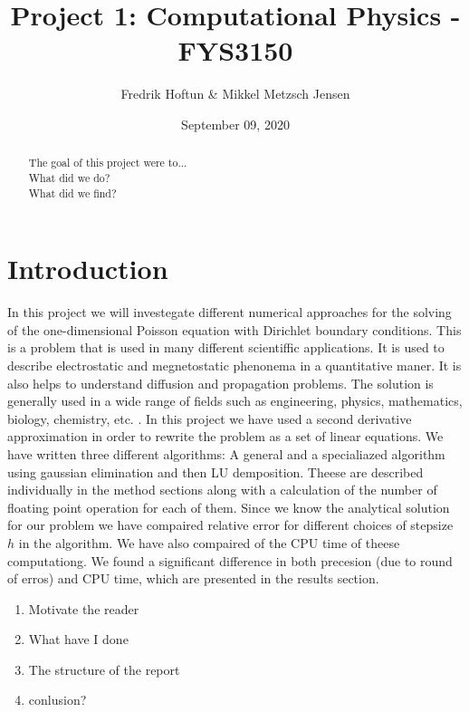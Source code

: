 \documentclass[american,a4paper,12pt]{article}
\title{Project 1: Computational Physics - FYS3150}
\author{Fredrik Hoftun \& Mikkel Metzsch Jensen}
\date{September 09, 2020}
\begin{document}
\maketitle

\tableofcontents


\begin{abstract}
  The goal of this project were to... \\
  What did we do? \\
  What did we find? \\
\end{abstract}

\section{Introduction}
  In this project we will investegate different numerical approaches for the solving of the one-dimensional Poisson equation with Dirichlet boundary conditions. This is a problem that is used in many different scientiffic applications. It is used to describe electrostatic and megnetostatic phenonema in a quantitative maner. It is also helps to understand diffusion and propagation problems. The solution is generally used in a wide range of fields such as engineering, physics, mathematics, biology, chemistry, etc. \cite{poisson_paper}. In this project we have used a second derivative approximation in order to rewrite the problem as a set of linear equations. We have written three different algorithms: A general and a specialiazed algorithm using gaussian elimination and then LU demposition. Theese are described individually in the method sections along with a calculation of the number of floating point operation for each of them. Since we know the analytical solution for our problem we have compaired relative error for different choices of stepsize $h$ in the algorithm. We have also compaired of the CPU time of theese computationg. We found a significant difference in both precesion (due to round of erros) and CPU time, which are presented in the results section.

  \begin{enumerate}
    \item Motivate the reader
    \item What have I done
    \item The structure of the report
    \item conlusion?
  \end{enumerate}
\end{document}
